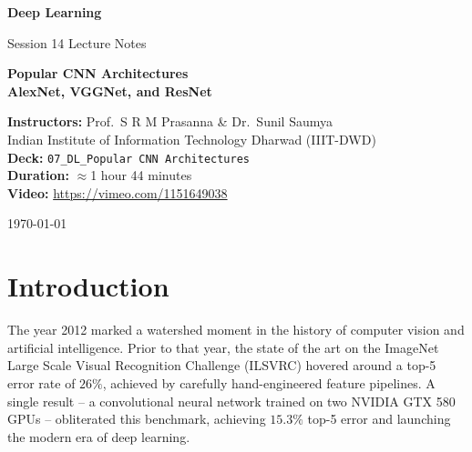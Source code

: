 \documentclass[12pt,a4paper]{article}
\begin{document}
\begin{titlepage}
  \centering
  \vspace*{2cm}
  {\LARGE\bfseries Deep Learning\par}
  \vspace{0.5cm}
  {\large Session 14 Lecture Notes\par}
  \vspace{1.5cm}
  {\huge\bfseries Popular CNN Architectures\\[0.4em]
   AlexNet, VGGNet, and ResNet\par}
  \vspace{1.5cm}
  {\large
    \textbf{Instructors:} Prof.\ S R M Prasanna \& Dr.\ Sunil Saumya\\[0.3em]
    Indian Institute of Information Technology Dharwad (IIIT-DWD)\\[0.3em]
    \textbf{Deck:} \texttt{07\_DL\_Popular CNN Architectures}\\[0.3em]
    \textbf{Duration:} $\approx$1 hour 44 minutes\\[0.3em]
    \textbf{Video:} \url{https://vimeo.com/1151649038}
  }
  \vfill
  {\large\today\par}
\end{titlepage}

\tableofcontents
\newpage

\section{Introduction}
\label{sec:intro}

The year 2012 marked a watershed moment in the history of computer vision and artificial intelligence. Prior to that year, the state of the art on the ImageNet Large Scale Visual Recognition Challenge (ILSVRC) hovered around a top-5 error rate of $26\%$, achieved by carefully hand-engineered feature pipelines. A single result -- a convolutional neural network trained on two NVIDIA GTX 580 GPUs -- obliterated this benchmark, achieving $15.3\%$ top-5 error and launching the modern era of deep learning.
\end{document}
